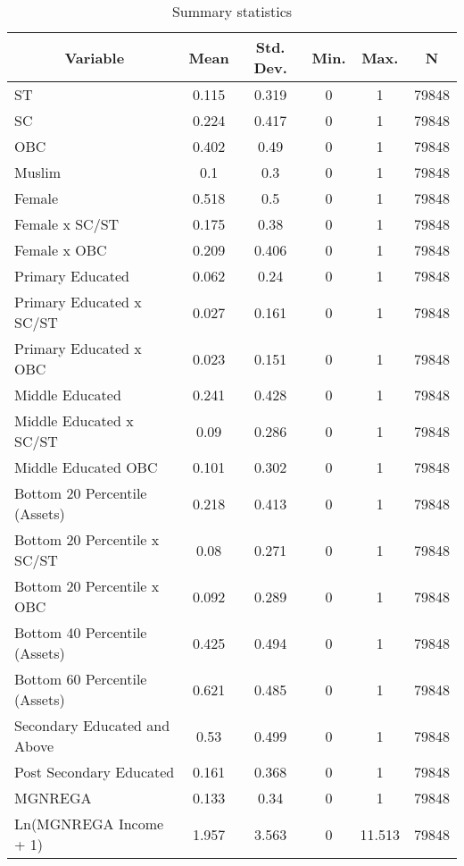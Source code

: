 
\begin{table}[htbp]\centering \caption{Summary statistics \label{descstat}}
\begin{tabular}{l c c c c c}\hline\hline
\multicolumn{1}{c}{\textbf{Variable}} & \textbf{Mean}
 & \textbf{Std. Dev.}& \textbf{Min.} &  \textbf{Max.} & \textbf{N}\\ \hline
ST & 0.115 & 0.319 & 0 & 1 & 79848\\
SC & 0.224 & 0.417 & 0 & 1 & 79848\\
OBC & 0.402 & 0.49 & 0 & 1 & 79848\\
Muslim & 0.1 & 0.3 & 0 & 1 & 79848\\
Female & 0.518 & 0.5 & 0 & 1 & 79848\\
Female x SC/ST & 0.175 & 0.38 & 0 & 1 & 79848\\
Female x OBC & 0.209 & 0.406 & 0 & 1 & 79848\\
Primary Educated & 0.062 & 0.24 & 0 & 1 & 79848\\
Primary Educated x SC/ST & 0.027 & 0.161 & 0 & 1 & 79848\\
Primary Educated x OBC & 0.023 & 0.151 & 0 & 1 & 79848\\
Middle Educated & 0.241 & 0.428 & 0 & 1 & 79848\\
Middle Educated x SC/ST & 0.09 & 0.286 & 0 & 1 & 79848\\
Middle Educated OBC & 0.101 & 0.302 & 0 & 1 & 79848\\
Bottom 20 Percentile (Assets) & 0.218 & 0.413 & 0 & 1 & 79848\\
Bottom 20 Percentile x SC/ST & 0.08 & 0.271 & 0 & 1 & 79848\\
Bottom 20 Percentile x OBC & 0.092 & 0.289 & 0 & 1 & 79848\\
Bottom 40 Percentile (Assets) & 0.425 & 0.494 & 0 & 1 & 79848\\
Bottom 60 Percentile (Assets) & 0.621 & 0.485 & 0 & 1 & 79848\\
Secondary Educated and Above & 0.53 & 0.499 & 0 & 1 & 79848\\
Post Secondary Educated & 0.161 & 0.368 & 0 & 1 & 79848\\
MGNREGA & 0.133 & 0.34 & 0 & 1 & 79848\\
Ln(MGNREGA Income + 1) & 1.957 & 3.563 & 0 & 11.513 & 79848\\
\hline\end{tabular}
\end{table}
